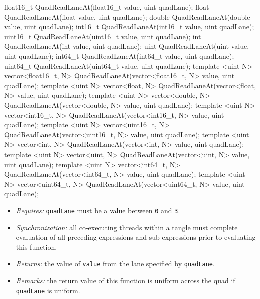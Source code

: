 \begin{HLSL}
float16_t QuadReadLaneAt(float16_t value, uint quadLane);
float QuadReadLaneAt(float value, uint quadLane);
double QuadReadLaneAt(double value, uint quadLane);
int16_t QuadReadLaneAt(int16_t value, uint quadLane);
uint16_t QuadReadLaneAt(uint16_t value, uint quadLane);
int QuadReadLaneAt(int value, uint quadLane);
uint QuadReadLaneAt(uint value, uint quadLane);
int64_t QuadReadLaneAt(int64_t value, uint quadLane);
uint64_t QuadReadLaneAt(uint64_t value, uint quadLane);
template <uint N>
vector<float16_t, N> QuadReadLaneAt(vector<float16_t, N> value, uint quadLane);
template <uint N>
vector<float, N> QuadReadLaneAt(vector<float, N> value, uint quadLane);
template <uint N>
vector<double, N> QuadReadLaneAt(vector<double, N> value, uint quadLane);
template <uint N>
vector<int16_t, N> QuadReadLaneAt(vector<int16_t, N> value, uint quadLane);
template <uint N>
vector<uint16_t, N> QuadReadLaneAt(vector<uint16_t, N> value, uint quadLane);
template <uint N>
vector<int, N> QuadReadLaneAt(vector<int, N> value, uint quadLane);
template <uint N>
vector<uint, N> QuadReadLaneAt(vector<uint, N> value, uint quadLane);
template <uint N>
vector<int64_t, N> QuadReadLaneAt(vector<int64_t, N> value, uint quadLane);
template <uint N>
vector<uint64_t, N> QuadReadLaneAt(vector<uint64_t, N> value, uint quadLane);
\end{HLSL}

\begin{itemize}
  \item \textit{Requires:} \texttt{quadLane} must be a value between \texttt{0}
  and \texttt{3}.
  \item \textit{Synchronization:} all co-executing threads within a \gls{tangle}
  must complete evaluation of all preceding expressions and sub-expressions
  prior to evaluating this function.
  \item \textit{Returns:} the value of \texttt{value} from the \gls{lane}
  specified by \texttt{quadLane}.
  \item \textit{Remarks:} the return value of this function is uniform across
  the \gls{quad} if \texttt{quadLane} is uniform.
\end{itemize}


